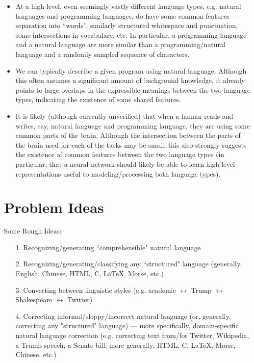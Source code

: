 \documentclass[12pt,letterpaper]{article}
\theoremstyle{remark}
\theoremstyle{plain}
\begin{document}
\begin{itemize}
\item At a high level, even seemingly vastly different language types, e.g. natural languages and programming languages, do have some common features---separation into ``words", similarly structured whitespace and punctuation, some intersections in vocabulary, etc. In particular, a programming language and a natural language are more similar than a programming/natural language and a randomly sampled sequence of characters.
\item We can typically describe a given program using natural language. Although this often assumes a significant amount of background knowledge, it already points to large overlaps in the expressible meanings between the two language types, indicating the existence of some shared features. 
\item It is likely (although currently unverified) that when a human reads and writes, say, natural language and programming language, they are using some common parts of the brain. Although the intersection between the parts of the brain used for each of the tasks may be small, this also strongly suggests the existence of common features between the two language types (in particular, that a neural network should likely be able to learn high-level representations useful to modeling/processing both language types). 
\end{itemize}








\section{Problem Ideas}

Some Rough Ideas:

\begin{enumerate}
\item[1.] Recognizing/generating ``comprehensible" natural language
\item[2.] Recognizing/generating/classifying any ``structured" language (generally, English, Chinese, HTML, C, LaTeX, Morse, etc.)
\item[3.] Converting between linguistic styles (e.g. academic $\leftrightarrow$ Trump $\leftrightarrow$ Shakespeare $\leftrightarrow$ Twitter)
\item[4.] Correcting informal/sloppy/incorrect natural language (or, generally, correcting any "structured" language) --- more specifically, domain-specific natural language correction (e.g. correcting text from/for Twitter, Wikipedia, a Trump speech, a Senate bill; more generally, HTML, C, LaTeX, Morse, Chinese, etc.)
\end{enumerate}
\end{document}
